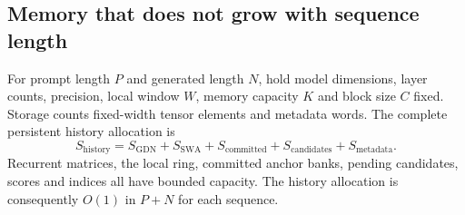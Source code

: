 \subsection{Memory that does not grow with sequence length}

For prompt length $P$ and generated length $N$, hold model dimensions, layer counts, precision, local window $W$, memory capacity $K$ and block size $C$ fixed. Storage counts fixed-width tensor elements and metadata words. The complete persistent history allocation is
\begin{equation}
S_{\mathrm{history}}=S_{\mathrm{GDN}}+S_{\mathrm{SWA}}+S_{\mathrm{committed}}+S_{\mathrm{candidates}}+S_{\mathrm{metadata}}.
\end{equation}
Recurrent matrices, the local ring, committed anchor banks, pending candidates, scores and indices all have bounded capacity. The history allocation is consequently $O(1)$ in $P+N$ for each sequence.

